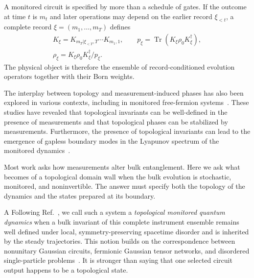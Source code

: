 \documentclass[aps,prb,twocolumn,superscriptaddress,longbibliography]{revtex4-2}
\DeclareMathOperator{\Tr}{Tr}%
\theoremstyle{plain}
\theoremstyle{definition}
\theoremstyle{remark}
\begin{document}
A monitored circuit is specified by more than a schedule of gates.  If the outcome at time $t$ is $m_t$ and later operations may depend on the earlier record $\xi_{<t}$, a complete record $\xi=(m_1,\ldots,m_T)$ defines
\begin{equation}
 \begin{gathered}
 K_\xi=K_{m_T|\xi_{<T},T}\cdots K_{m_1,1},\qquad
 p_\xi=\Tr(K_\xi\rho_0K_\xi^\dagger),\\
 \rho_\xi=K_\xi\rho_0K_\xi^\dagger/p_\xi .
 \end{gathered}
 \label{eq:instrument}
\end{equation}
The physical object is therefore the ensemble of record-conditioned evolution operators together with their Born weights.

The interplay between topology and measurement-induced phases has also been explored in various contexts, including in monitored free-fermion systems~\cite{Kells2023,Oshima2025,XiaoKawabata2026,BhuiyanPanJian2026}. These studies have revealed that topological invariants can be well-defined in the presence of measurements and that topological phases can be stabilized by measurements. Furthermore, the presence of topological invariants can lead to the emergence of gapless boundary modes in the Lyapunov spectrum of the monitored dynamics~\cite{Oshima2025,BhuiyanPanJian2026,XiaoKawabata2026}.

Most work asks how measurements alter bulk entanglement.  Here we ask what becomes of a topological domain wall when the bulk evolution is stochastic, monitored, and noninvertible.  The answer must specify both the topology of the dynamics and the states prepared at its boundary.

A  Following Ref.~\cite{BhuiyanPanJian2026}, we call such a system a \emph{topological monitored quantum dynamics} when a bulk invariant of this complete instrument ensemble remains well defined under local, symmetry-preserving spacetime disorder and is inherited by the steady trajectories.  This notion builds on the correspondence between nonunitary Gaussian circuits, fermionic Gaussian tensor networks, and disordered single-particle problems~\cite{Jian2022,Ludwig2013}.  It is stronger than saying that one selected circuit output happens to be a topological state.
\end{document}
